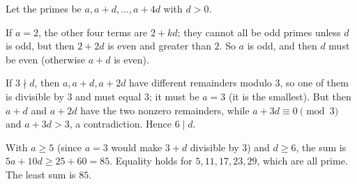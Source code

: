 Let the primes be $a,a+d,\dots,a+4d$ with $d>0$.

If $a=2$, the other four terms are $2+kd$; they cannot all be odd primes unless $d$ is odd, but then $2+2d$ is even and greater than $2$. So $a$ is odd, and then $d$ must be even (otherwise $a+d$ is even).

If $3\nmid d$, then $a,a+d,a+2d$ have different remainders modulo $3$, so one of them is divisible by $3$ and must equal $3$; it must be $a=3$ (it is the smallest). But then $a+d$ and $a+2d$ have the two nonzero remainders, while $a+3d\equiv0\pmod3$ and $a+3d>3$, a contradiction. Hence $6\mid d$.

With $a\ge5$ (since $a=3$ would make $3+d$ divisible by $3$) and $d\ge6$, the sum is $5a+10d\ge25+60=85$. Equality holds for $5,11,17,23,29$, which are all prime. The least sum is $\boxed{85}$.
